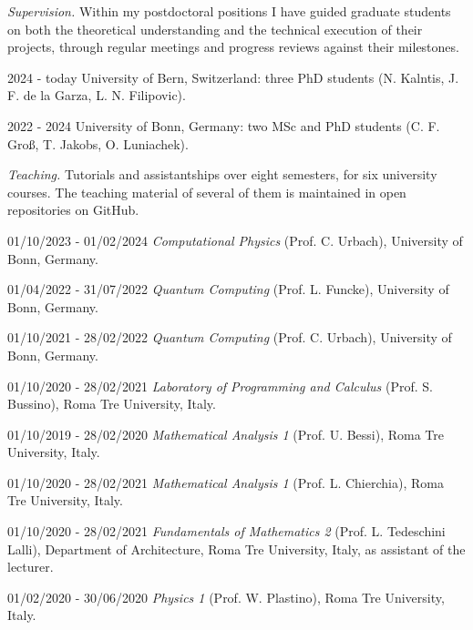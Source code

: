 
\noindent\hspace{0.5cm}\begin{minipage}{\dimexpr\textwidth-0.5cm\relax}
\textit{Supervision.} Within my postdoctoral positions I have guided graduate students on both the theoretical
understanding and the technical execution of their projects, through regular meetings and progress reviews
against their milestones.
\end{minipage}

\begin{cvlist}
\item[2024 - today] University of Bern, Switzerland: three PhD students (N. Kalntis, J. F. de la Garza,
L. N. Filipovic).
\item[2022 - 2024] University of Bonn, Germany: two MSc and PhD students (C. F. Groß, T. Jakobs, O. Luniachek).
\end{cvlist}

\noindent\hspace{0.5cm}\begin{minipage}{\dimexpr\textwidth-0.5cm\relax}
\textit{Teaching.} Tutorials and assistantships over eight semesters, for six university courses. The teaching material of several of
them is maintained in open repositories on GitHub.
\end{minipage}

\begin{cvlist}
\item[01/10/2023 - 01/02/2024] \textit{Computational Physics} (Prof. C. Urbach), University of Bonn, Germany.
\item[01/04/2022 - 31/07/2022] \textit{Quantum Computing} (Prof. L. Funcke), University of Bonn, Germany.
\item[01/10/2021 - 28/02/2022] \textit{Quantum Computing} (Prof. C. Urbach), University of Bonn, Germany.
\item[01/10/2020 - 28/02/2021] \textit{Laboratory of Programming and Calculus} (Prof. S. Bussino), Roma Tre
University, Italy.
\item[01/10/2019 - 28/02/2020] \textit{Mathematical Analysis 1} (Prof. U. Bessi), Roma Tre University, Italy.
\item[01/10/2020 - 28/02/2021] \textit{Mathematical Analysis 1} (Prof. L. Chierchia), Roma Tre University, Italy.
\item[01/10/2020 - 28/02/2021] \textit{Fundamentals of Mathematics 2} (Prof. L. Tedeschini Lalli), Department
of Architecture, Roma Tre University, Italy, as assistant of the lecturer.
\item[01/02/2020 - 30/06/2020] \textit{Physics 1} (Prof. W. Plastino), Roma Tre University, Italy.
\end{cvlist}


